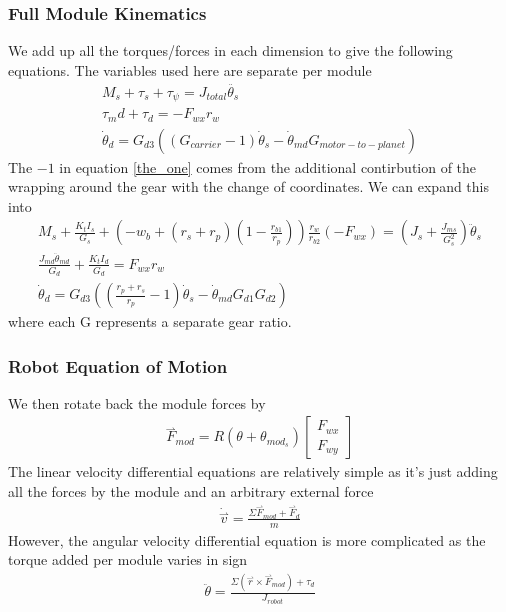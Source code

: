 \documentclass{article}
\newcommand{\harpoon}{\overset{\rightharpoonup}}
\begin{document}
\subsubsection{Full Module Kinematics}
We add up all the torques/forces in each dimension to give the following equations. The variables used here are separate per module
\begin{gather}
    M_s + \tau_s + \tau_\psi = J_{total}\ddot{\theta_s}\\
    \tau_md + \tau_d = -F_{wx}r_w\\
    \dot\theta_d = G_{d3}\left(\left(G_{carrier} - 1\right)\dot\theta_s - \dot\theta_{md}G_{motor-to-planet}\right) \label{the_one}
\end{gather}
The $-1$ in equation \eqref{the_one} comes from the additional contirbution of the wrapping around the gear with the change of coordinates.
We can expand this into
\begin{gather}
    M_s + \frac{K_tI_s}{G_s} + \left(-w_b+\left(r_s+r_p\right)\left(1-\frac{r_{b1}}{r_p}\right)\right)\frac{r_w}{r_{b2}}\left(-F_{wx}\right) = \left(J_s + \frac{J_{ms}}{G^2_s}\right)\ddot\theta_s\\
    \frac{J_{md}\ddot\theta_{md}}{G_d}+\frac{K_{t}I_d}{G_d} = F_{wx}r_w \label{md_ddot}\\
    \dot\theta_d = G_{d3}\left(\left(\frac{r_p+r_s}{r_p}-1\right)\dot\theta_s - \dot\theta_{md}G_{d1}G_{d2}\right)
\end{gather}
where each G represents a separate gear ratio.
\subsubsection{Robot Equation of Motion}
We then rotate back the module forces by
\begin{gather}
    \harpoon{F}_{mod} = R(\theta + \theta_{mod_s})\begin{bmatrix}
        F_{wx} \\
        F_{wy}
    \end{bmatrix}
\end{gather}
The linear velocity differential equations are relatively simple as it's just adding all the forces by the module and an arbitrary external force
\begin{gather}
    \dot{\harpoon{v}} = \frac{\Sigma \harpoon{F}_{mod} + \harpoon{F}_{d}}{m}
\end{gather}
However, the angular velocity differential equation is more complicated as the torque added per module varies in sign
\begin{gather}
    \ddot{\theta} = \frac{\Sigma\left(\harpoon{r} \times \harpoon{F}_{mod}\right) + \tau_{d}}{J_{robot}}
\end{gather}
\end{document}
